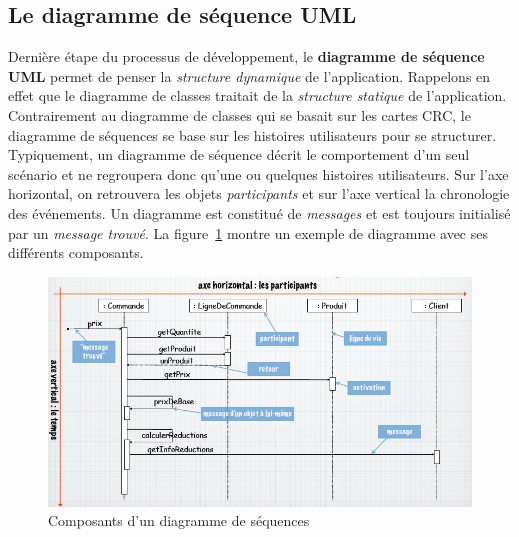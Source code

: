 \subsection{Le diagramme de séquence UML}
Dernière étape du processus de développement,
le \textbf{diagramme de séquence UML} permet de penser
la \emph{structure dynamique} de l'application.
Rappelons en effet que le diagramme de classes traitait
de la \emph{structure statique} de l'application.
Contrairement au diagramme de classes qui se basait sur les cartes CRC,
le diagramme de séquences se base sur les histoires
utilisateurs pour se structurer.
Typiquement, un diagramme de séquence décrit le comportement d'un
seul scénario et ne regroupera donc qu'une ou quelques histoires utilisateurs.
Sur l'axe horizontal,
on retrouvera les objets \emph{participants} et sur
l'axe vertical la chronologie des événements.
Un diagramme est constitué de \emph{messages} et
est toujours initialisé par un \emph{message trouvé}.
La figure~\ref{diagramme_sequences} montre un
exemple de diagramme avec ses différents composants.

\begin{figure}[h]
  \centering
  \hspace*{-0.25cm}
  \includegraphics[scale=0.75]{diagramme_sequences.jpg}
  \caption{Composants d'un diagramme de séquences}
  \label{diagramme_sequences}
\end{figure}

